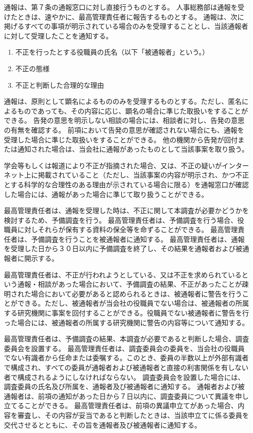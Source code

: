 \documentclass[10pt,a4paper,uplatex]{jsarticle}
\begin{document}
通報は、第７条の通報窓口に対し直接行うものとする。
\term 人事総務部は通報を受けたときは、速やかに、最高管理責任者に報告するものとする。
\term 通報は、次に掲げるすべての事項が明示されている場合のみを受理することとし、当該通報者に対して受理したことを通知する。
\begin{enumerate}
	\item 不正を行ったとする役職員の氏名（以下「被通報者」という。）
	\item 不正の態様
	\item 不正と判断した合理的な理由
\end{enumerate}
\term 通報は、原則として顕名によるもののみを受理するものとする。ただし、匿名によるものであっても、その内容に応じ、顕名の場合に準じた取扱いをすることができる。
\term 告発の意思を明示しない相談の場合には、相談者に対し、告発の意思の有無を確認する。
\term 前項において告発の意思が確認されない場合にも、通報を受理した場合に準じた取扱いをすることができる。
\term 他の機関から告発が回付または通知された場合は、当会社に通報があったものとして当該事案を取り扱う。

学会等もしくは報道により不正が指摘された場合、又は、不正の疑いがインターネット上に掲載されていること（ただし、当該事案の内容が明示され、かつ不正とする科学的な合理性のある理由が示されている場合に限る）を通報窓口が確認した場合には、通報があった場合に準じて取り扱うことができる。　

最高管理責任者は、通報を受理した時は、不正に関して本調査が必要かどうかを検討するため、予備調査を行う。
\term 最高管理責任者は、予備調査を行う場合、役職員に対しそれらが保有する資料の保全等を命ずることができる。
\term 最高管理責任者は、予備調査を行うことを被通報者に通知する。
\term 最高管理責任者は、通報を受理した日から３０日以内に予備調査を終了し、その結果を通報者および被通報者に開示する。

最高管理責任者は、不正が行われようとしている、又は不正を求められているという通報・相談があった場合において、予備調査の結果、不正があったことが疎明された場合において必要があると認められるときは、被通報者に警告を行うことができる。ただし、被通報者が当会社の役職員でない場合は、被通報者の所属する研究機関に事案を回付することができる。役職員でない被通報者に警告を行った場合には、被通報者の所属する研究機関に警告の内容等について通知する。

最高管理責任者は、予備調査の結果、本調査が必要であると判断した場合、調査委員会を設置する。
\term 最高管理責任者は、調査委員会の委員を、当会社の役職員でない有識者から任命または委嘱する。このとき、委員の半数以上が外部有識者で構成され、すべての委員が通報者および被通報者と直接の利害関係を有しない者で構成されるようにしなければならない。
\term 調査委員会を設置した場合には、調査委員の氏名及び所属を、通報者及び被通報者に通知する。
\term 通報者および被通報者は、前項の通知があった日から７日以内に、調査委員について異議を申し立てることができる。
\term 最高管理責任者は、前項の異議申立てがあった場合、内容を審査し、その内容が妥当であると判断したときは、当該申立てに係る委員を交代させるとともに、その旨を通報者及び被通報者に通知する。
\end{document}
